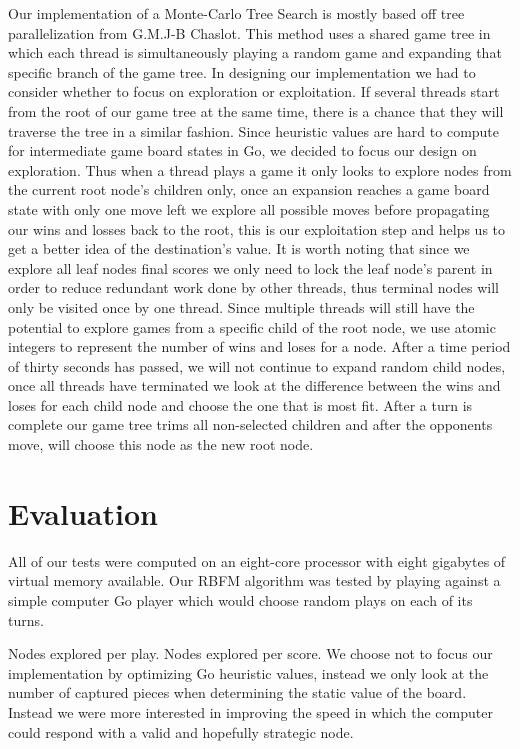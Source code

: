 \documentclass[conference]{IEEEtran}
\begin{document}
Our implementation of a Monte-Carlo Tree Search is mostly based off tree parallelization from G.M.J-B Chaslot. This method uses a shared game tree in which each thread is simultaneously playing a random game and expanding that specific branch of the game tree. In designing our implementation we had to consider whether to focus on exploration or exploitation.  If several threads start from the root of our game tree at the same time, there is a chance that they will traverse the tree in a similar fashion. Since heuristic values are hard to compute for intermediate game board states in Go, we decided to focus our design on exploration. Thus when a thread plays a game it only looks to explore nodes from the current root node's children only, once an expansion reaches a game board state with only one move left we explore all possible moves before propagating our wins and losses back to the root, this is our exploitation step and helps us to get a better idea of the destination's value. It is worth noting that since we explore all leaf nodes final scores we only need to lock the leaf node's parent in order to reduce redundant work done by other threads, thus terminal nodes will only be visited once by one thread. Since multiple threads will still have the potential to explore games from a specific child of the root node, we use atomic integers to represent the number of wins and loses for a node. After a time period of thirty seconds has passed, we will not continue to expand random child nodes, once all threads have terminated we look at the difference between the wins and loses for each child node and choose the one that is most fit. After a turn is complete our game tree trims all non-selected children and after the opponents move, will choose this node as the new root node.

\section{Evaluation}
All of our tests were computed on an eight-core processor with eight gigabytes of virtual memory available. Our RBFM algorithm was tested by playing against a simple computer Go player which would choose random plays on each of its turns. \par
Nodes explored per play.
Nodes explored per score.
We choose not to focus our implementation by optimizing Go heuristic values, instead we only look at the number of captured pieces when determining the static value of the board. Instead we were more interested in improving the speed in which the computer could respond with a valid and hopefully strategic node. 
\end{document}
